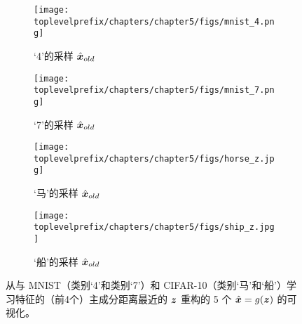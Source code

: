 \documentclass[../../book-main_zh.tex]{subfiles}
\begin{document}
\begin{figure}[t]
    \begin{subfigure}[t]{0.20\textwidth}
        \centering
        \texttt{[image: \\toplevelprefix/chapters/chapter5/figs/mnist\_4.png]}
        \caption{‘4’的采样 $\hat{\bm{x}}_{old}$}
    \end{subfigure}
    \hfill
    \begin{subfigure}[t]{0.20\textwidth}
        \centering
        \texttt{[image: \\toplevelprefix/chapters/chapter5/figs/mnist\_7.png]}
        \caption{‘7’的采样 $\hat{\bm{x}}_{old}$}
    \end{subfigure}
    \hfill
    \begin{subfigure}[t]{0.20\textwidth}
        \centering
        \texttt{[image: \\toplevelprefix/chapters/chapter5/figs/horse\_z.jpg]}
        \caption{‘马’的采样 $\hat{\bm{x}}_{old}$}
    \end{subfigure}
    \hfill
    \begin{subfigure}[t]{0.20\textwidth}
        \centering
        \texttt{[image: \\toplevelprefix/chapters/chapter5/figs/ship\_z.jpg]}
        \caption{‘船’的采样 $\hat{\bm{x}}_{old}$}
    \end{subfigure}
    \caption{\small 从与 {MNIST}（类别‘4’和类别‘7’）和 {CIFAR-10}（类别‘马’和‘船’）学习特征的（前4个）主成分距离最近的 $\bm{z}$ 重构的 5 个 $\hat {\bm{x}}=g(\bm{z})$ 的可视化。}
    \label{fig:pca_sampling_main}
\end{figure}

\end{document}
